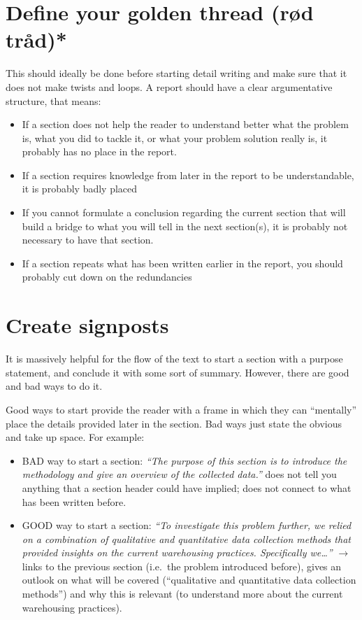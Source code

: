 \documentclass[
]{book}
\begin{document}
\hypertarget{define-your-golden-thread-ruxf8d-truxe5d}{%
\section{Define your golden thread (rød tråd)*}\label{define-your-golden-thread-ruxf8d-truxe5d}}

This should ideally be done before starting detail writing
and make sure that it does not make twists and loops. A report
should have a clear argumentative structure, that means:

\begin{itemize}
\item
  If a section does not help the reader to understand better what
  the problem is, what you did to tackle it, or what your
  problem solution really is, it probably has no place in the
  report.
\item
  If a section requires knowledge from later in the report to be
  understandable, it is probably badly placed
\item
  If you cannot formulate a conclusion regarding the current
  section that will build a bridge to what you will tell in the
  next section(s), it is probably not necessary to have that
  section.
\item
  If a section repeats what has been written earlier in the
  report, you should probably cut down on the redundancies
\end{itemize}

\hypertarget{create-signposts}{%
\section{Create signposts}\label{create-signposts}}

It is massively helpful for the flow of the text
to start a section with a purpose statement, and conclude it with
some sort of summary. However, there are good and bad ways to do
it.

Good ways to start provide the reader with a frame in which they can
``mentally'' place the details provided later in the section. Bad ways
just state the obvious and take up space. For example:

\begin{itemize}
\item
  BAD way to start a section: \emph{``The purpose of this section is to
  introduce the methodology and give an overview of the collected
  data.''} does not tell you anything that a section header could
  have implied; does not connect to what has been written before.
\item
  GOOD way to start a section: \emph{``To investigate this problem further, we relied on a combination of qualitative and quantitative data collection methods that provided insights on the current warehousing practices. Specifically we\ldots{}''} \(\rightarrow\) links to the previous
  section (i.e.~the problem introduced before), gives an outlook on
  what will be covered (``qualitative and quantitative data collection methods'') and why this is relevant (to understand more
  about the current warehousing practices).
\end{itemize}
\end{document}
